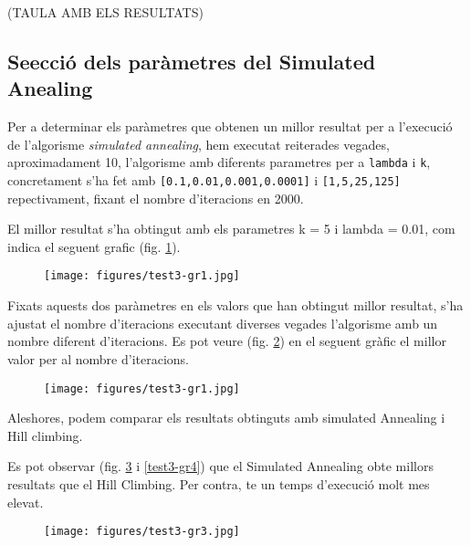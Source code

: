         (TAULA AMB ELS RESULTATS)



\subsection{Se\lgem ecció dels paràmetres del Simulated Anealing}
Per a determinar els paràmetres que obtenen un millor resultat per a l'execució de l'algorisme \emph{simulated annealing},
hem executat reiterades vegades, aproximadament 10, l'algorisme amb diferents parametres per a \texttt{lambda} i \texttt{k}, concretament s'ha fet amb
\texttt{[0.1,0.01,0.001,0.0001]} i \texttt{[1,5,25,125]} repectivament, fixant el nombre d'iteracions en 2000.

El millor resultat s'ha obtingut amb els parametres k = 5 i lambda = 0.01, com indica el seguent grafic (fig. \ref{test3-gr1}).

\begin{figure}[H]
\begin{center} 
 \texttt{[image: figures/test3-gr1.jpg]}
\label{test3-gr1}
\end{center}
\end{figure}

Fixats aquests dos paràmetres en els valors que han obtingut millor resultat, s'ha ajustat el nombre d'iteracions executant diverses 
vegades l'algorisme amb un nombre diferent d'iteracions. Es pot veure (fig. \ref{test3-gr2}) en el seguent gràfic el millor valor per al nombre d'iteracions.

\begin{figure}[H]
\begin{center}
 \texttt{[image: figures/test3-gr1.jpg]}
 \label{test3-gr2}
\end{center}
\end{figure}



Aleshores, podem comparar els resultats obtinguts amb simulated Annealing i Hill climbing.

Es pot observar (fig. \ref{test3-gr3} i \ref{test3-gr4}) que el Simulated Annealing obte millors resultats que el Hill Climbing. Per contra, te un temps d'execució molt mes elevat.

\begin{figure}[H]
\begin{center} 
 \texttt{[image: figures/test3-gr3.jpg]}
\label{test3-gr3}
\end{center}
\end{figure}


